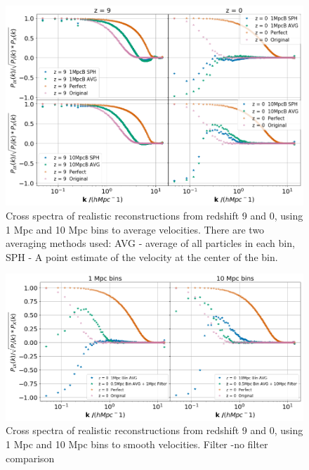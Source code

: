 \begin{figure}
    \centering
    \includegraphics[width=1\columnwidth]{images/realRecon/sphVsAvg.png}%
    
    \caption{
    Cross spectra of realistic reconstructions from redshift 9 and 0, using 1 Mpc and 10 Mpc bins to average velocities. There are two averaging methods used: AVG - average of all particles in each bin, SPH - A point estimate of the velocity at the center of the bin.  
    }
    
    \label{fig:8}
\end{figure}

\begin{figure}
    \centering
    \includegraphics[width=1\columnwidth]{images/realRecon/filterComp.png}%
    
    \caption{
        Cross spectra of realistic reconstructions from redshift 9 and 0, using 1 Mpc and 10 Mpc bins to smooth velocities. Filter -no filter comparison
    }
    
    \label{fig:9}
\end{figure}


